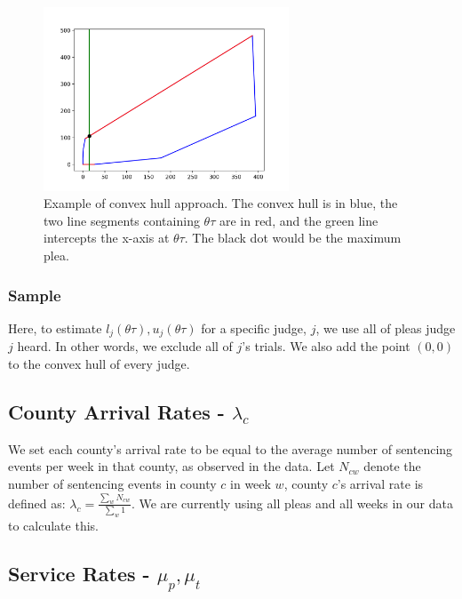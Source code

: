 \documentclass[11pt, oneside]{article}   	%
\theoremstyle{ModifiedStyle}
\begin{document}
    \begin{figure}[H]
      \centering
      \includegraphics[width=0.65\textwidth]{../../output/figures/Exploration/convex_hull_max.png}
      \caption{Example of convex hull approach. The convex hull is in blue, the two line segments containing $\theta \tau$ are in red, and the green line intercepts the x-axis at $\theta \tau$. The black dot would be the maximum plea.}
      \label{fig-convex-hull}
    \end{figure}

    \subsubsection{Sample}
      Here, to estimate $l_j(\theta \tau),u_j(\theta \tau)$ for a specific judge, $j$, we use all of pleas judge $j$ heard. In other words, we exclude all of $j$'s trials. We also add the point $(0,0)$ to the convex hull of every judge.

  \subsection{County Arrival Rates - $\lambda_c$}
    \label{lambda_c-estimation}
    We set each county's arrival rate to be equal to the average number of sentencing events per week in that county, as observed in the data. Let $N_{cw}$ denote the number of sentencing events in county $c$ in week $w$, county $c$'s arrival rate is defined as: $\lambda_c = \frac{\sum_w N_{cw}}{\sum_w 1}$. We are currently using all pleas and all weeks in our data to calculate this.

  \subsection{Service Rates - $\mu_p,\mu_t$}
    \label{service_rate-estimation}
\end{document}
